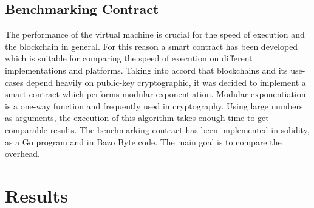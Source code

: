 \subsection{Benchmarking Contract}
The performance of the virtual machine is crucial for the speed of execution and the blockchain in general. For this reason a smart contract has been developed which is suitable for comparing the speed of execution on different implementations and platforms. Taking into accord that blockchains and its use-cases depend heavily on public-key cryptographic, it was decided to implement a smart contract which performs modular exponentiation. Modular exponentiation is a one-way function and frequently used in cryptography. Using large numbers as arguments, the execution of this algorithm takes enough time to get comparable results. The benchmarking contract has been implemented in solidity, as a Go program and in Bazo Byte code. The main goal is to compare the overhead.

\section{Results}
